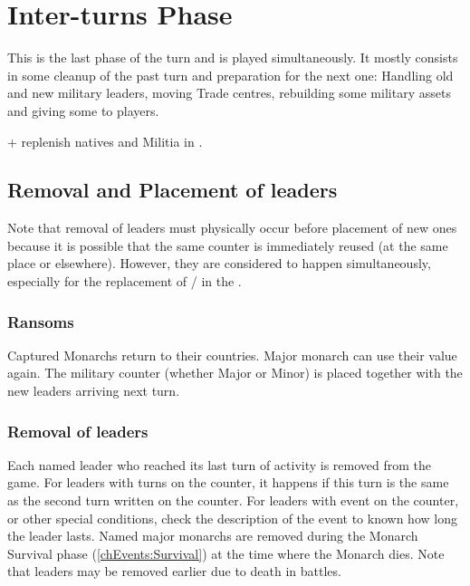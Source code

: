 \chapter{Inter-turns Phase}\label{chapter:Inter}



This is the last phase of the turn and is played simultaneously. It mostly
consists in some cleanup of the past turn and preparation for the next one:
Handling old and new military leaders, moving Trade centres, rebuilding some
military assets and giving some \VPs to players.


\begin{todo}
  + replenish natives and Militia in \ROTW.
\end{todo}

\aparag[Sequence.]
\InterDetails

\section{Removal and Placement of leaders}\label{chInter:Leaders}
\begin{designnote}
  Note that removal of leaders must physically occur before placement of new
  ones because it is possible that the same \anonyme counter is immediately
  reused (at the same place or elsewhere). However, they are considered to
  happen simultaneously, especially for the replacement of \LeaderC/\LeaderE
  in the \ROTW.
\end{designnote}

\subsection{Ransoms}
 Captured Monarchs return to their countries.
\bparag Major monarch can use their value again.
\bparag The military counter (whether Major or Minor) is placed together with
the new leaders arriving next turn.

\subsection{Removal of leaders}
\aparag[Death]
Each named leader who reached its last turn of activity is removed from the
game.
\bparag For leaders with turns on the counter, it happens if this turn is the
same as the second turn written on the counter.
\bparag For leaders with event on the counter, or other special conditions,
check the description of the event to known how long the leader lasts.
\bparag Named major monarchs are removed during the Monarch Survival phase
(\ref{chEvents:Survival}) at the time where the Monarch dies.
\bparag Note that leaders may be removed earlier due to death in battles.

